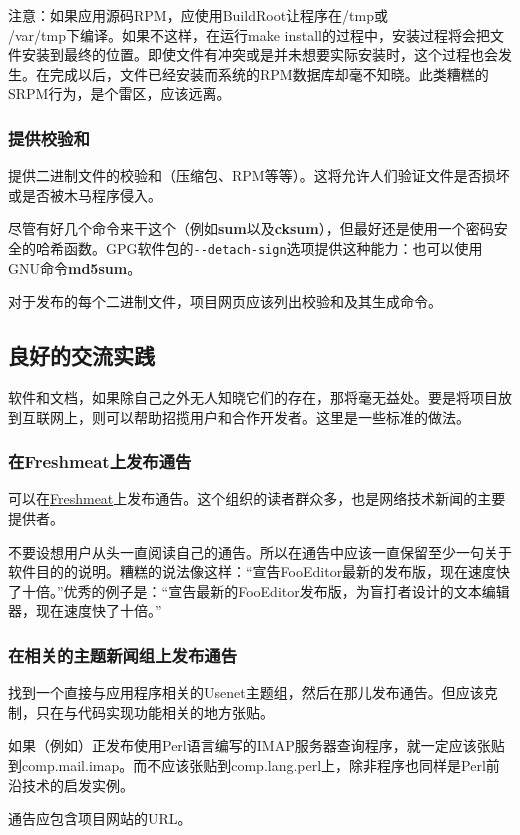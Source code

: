 \documentclass[12pt,oneside]{ctexbook}
\begin{document}
\begin{common-format}
注意：如果应用源码RPM，应使用BuildRoot让程序在/tmp或\\ /var/tmp下编译。如果不这样，在运行make install的过程中，安装过程将会把文件安装到最终的位置。即使文件有冲突或是并未想要实际安装时，这个过程也会发生。在完成以后，文件已经安装而系统的RPM数据库却毫不知晓。此类糟糕的SRPM行为，是个雷区，应该远离。

\subsubsection{提供校验和}
提供二进制文件的校验和（压缩包、RPM等等）。这将允许人们验证文件是否损坏或是否被木马程序侵入。

尽管有好几个命令来干这个（例如\textbf{sum}以及\textbf{cksum}），但最好还是使用一个密码安全的哈希函数。GPG软件包的\verb+--detach-sign+选项提供这种能力：也可以使用GNU命令\textbf{md5sum}。

对于发布的每个二进制文件，项目网页应该列出校验和及其生成命令。


\subsection{良好的交流实践}
软件和文档，如果除自己之外无人知晓它们的存在，那将毫无益处。要是将项目放到互联网上，则可以帮助招揽用户和合作开发者。这里是一些标准的做法。

\subsubsection{在Freshmeat上发布通告}
可以在\href{http://www.freshmeat.net/}{Freshmeat}上发布通告。这个组织的读者群众多，也是网络技术新闻的主要提供者。

不要设想用户从头一直阅读自己的通告。所以在通告中应该一直保留至少一句关于软件目的的说明。糟糕的说法像这样：“宣告FooEditor最新的发布版，现在速度快了十倍。”优秀的例子是：“宣告最新的FooEditor发布版，为盲打者设计的文本编辑器，现在速度快了十倍。”

\subsubsection{在相关的主题新闻组上发布通告}
找到一个直接与应用程序相关的Usenet主题组，然后在那儿发布通告。但应该克制，只在与代码实现功能相关的地方张贴。

如果（例如）正发布使用Perl语言编写的IMAP服务器查询程序，就一定应该张贴到comp.mail.imap。而不应该张贴到comp.lang.perl上，除非程序也同样是Perl前沿技术的启发实例。

通告应包含项目网站的URL。


\end{common-format}
\end{document}
